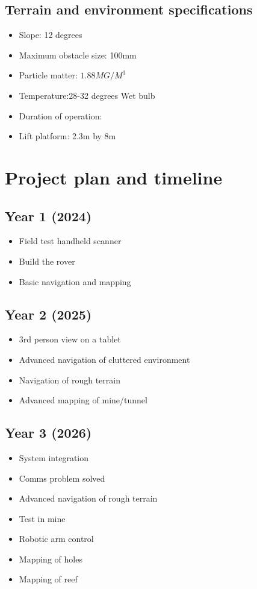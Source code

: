 	\subsection{Terrain and environment specifications}
		\begin{itemize}
			\item Slope: 12 degrees
			\item Maximum obstacle size: 100mm
			\item Particle matter: $1.88MG/M^3$
			\item Temperature:28-32 degrees Wet bulb
			\item Duration of operation:
			\item Lift platform: 2.3m by 8m
		\end{itemize}
	
\section{Project plan and timeline}

	\subsection{Year 1 (2024)}
		\begin{itemize}
			\item Field test handheld scanner
			\item Build the rover
			\item Basic navigation and mapping
		\end{itemize}

	\subsection{Year 2 (2025)}
		\begin{itemize}
			\item 3rd person view on a tablet
			\item Advanced navigation of cluttered environment
			\item Navigation of rough terrain
			\item Advanced mapping of mine/tunnel
		\end{itemize}

	\subsection{Year 3 (2026)}
		\begin{itemize}
			\item System integration
			\item Comms problem solved
			\item Advanced navigation of rough terrain
			\item Test in mine
			\item Robotic arm control
			\item Mapping of holes
			\item Mapping of reef
		\end{itemize}

